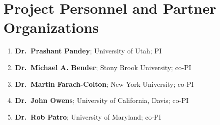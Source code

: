 
\section*{Project Personnel and Partner Organizations}
\vspace{0.1in}
\noindent
\begin{enumerate}
\item \textbf{Dr.\ Prashant Pandey}; University of Utah; PI
\item \textbf{Dr.\ Michael A. Bender}; Stony Brook University; co-PI
\item \textbf{Dr.\ Martin Farach-Colton}; New York University; co-PI
\item \textbf{Dr.\ John Owens}; University of California, Davis; co-PI
\item \textbf{Dr.\ Rob Patro}; University of Maryland; co-PI
\end{enumerate}
